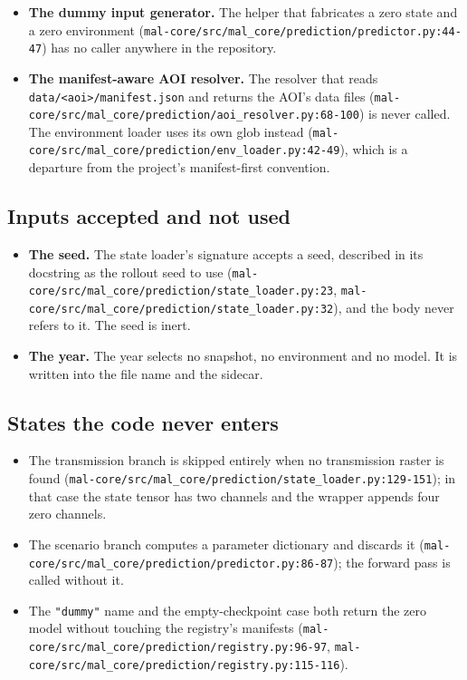 \documentclass[11pt,a4paper]{article}
\newcommand{\code}[1]{\texttt{#1}}
\begin{document}
\begin{itemize}
\item \textbf{The dummy input generator.} The helper that fabricates a
  zero state and a zero environment
  (\code{mal-core/src/mal\_core/prediction/predictor.py:44-47}) has no
  caller anywhere in the repository.
\item \textbf{The manifest-aware AOI resolver.} The resolver that reads
  \code{data/<aoi>/manifest.json} and returns the AOI's data files
  (\code{mal-core/src/mal\_core/prediction/aoi\_resolver.py:68-100}) is
  never called. The environment loader uses its own glob instead
  (\code{mal-core/src/mal\_core/prediction/env\_loader.py:42-49}), which is
  a departure from the project's manifest-first convention.
\end{itemize}

\subsection{Inputs accepted and not used}

\begin{itemize}
\item \textbf{The seed.} The state loader's signature accepts a seed,
  described in its docstring as the rollout seed to use
  (\code{mal-core/src/mal\_core/prediction/state\_loader.py:23},
  \code{mal-core/src/mal\_core/prediction/state\_loader.py:32}), and the
  body never refers to it. The seed is inert.
\item \textbf{The year.} The year selects no snapshot, no environment and no
  model. It is written into the file name and the sidecar.
\end{itemize}

\subsection{States the code never enters}

\begin{itemize}
\item The transmission branch is skipped entirely when no transmission raster
  is found (\code{mal-core/src/mal\_core/prediction/state\_loader.py:129-151});
  in that case the state tensor has two channels and the wrapper appends
  four zero channels.
\item The scenario branch computes a parameter dictionary and discards it
  (\code{mal-core/src/mal\_core/prediction/predictor.py:86-87}); the forward
  pass is called without it.
\item The \code{"dummy"} name and the empty-checkpoint case both return the
  zero model without touching the registry's manifests
  (\code{mal-core/src/mal\_core/prediction/registry.py:96-97},
  \code{mal-core/src/mal\_core/prediction/registry.py:115-116}).
\end{itemize}
\end{document}
